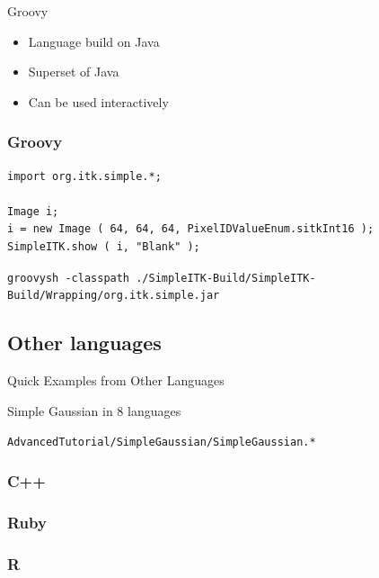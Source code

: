 \begin{frame}{Groovy}
\begin{itemize}
  \item Language build on Java
  \item Superset of Java
  \item Can be used interactively
\end{itemize}
\end{frame}

\begin{frame}[fragile]
\frametitle{Groovy}
\lstjava
\begin{lstlisting}
import org.itk.simple.*;

Image i;
i = new Image ( 64, 64, 64, PixelIDValueEnum.sitkInt16 );
SimpleITK.show ( i, "Blank" );
\end{lstlisting}
\fontsize{8pt}{8pt}\selectfont
\texttt{groovysh -classpath
 ./SimpleITK-Build/SimpleITK-Build/Wrapping/org.itk.simple.jar}
\end{frame}

\subsection{Other languages}

\begin{frame}{Quick Examples from Other Languages}
\fontsize{36pt}{36pt}\selectfont
\center
\begin{center}
Simple Gaussian in 8 languages
\end{center}
\vspace{20pt}
\begin{center}
\fontsize{11pt}{11pt}\selectfont
\texttt{AdvancedTutorial/SimpleGaussian/SimpleGaussian.*}
\end{center}
\end{frame}

\begin{frame}[fragile]
\frametitle{C++}
\lstcpp
{}

\end{frame}

\begin{frame}[fragile]
\lstcpp
\lstset{language=Ruby}
\frametitle{Ruby}

\end{frame}

\begin{frame}[fragile]
\lstcpp
\lstset{language=R}
\frametitle{R}

\end{frame}

